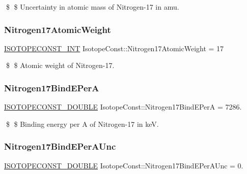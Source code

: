 \$ \$ Uncertainty in atomic mass of Nitrogen-\/17 in amu. \mbox{\label{group___isotope_const-_nitrogen-_n17_gacd721ae378ba38ecdf43a0a69a57ee52}} 
\subsubsection{\texorpdfstring{Nitrogen17\+Atomic\+Weight}{Nitrogen17AtomicWeight}}
{\footnotesize\ttfamily \mbox{\hyperlink{group___isotope_const-_macros_ga5f18360b3e99483a35c32d789e62621c}{I\+S\+O\+T\+O\+P\+E\+C\+O\+N\+S\+T\+\_\+\+I\+NT}} Isotope\+Const\+::\+Nitrogen17\+Atomic\+Weight = 17}

\$ \$ Atomic weight of Nitrogen-\/17. \mbox{\label{group___isotope_const-_nitrogen-_n17_gac155f17c87be01d90f3550236cef4a2b}} 
\subsubsection{\texorpdfstring{Nitrogen17\+Bind\+E\+PerA}{Nitrogen17BindEPerA}}
{\footnotesize\ttfamily \mbox{\hyperlink{group___isotope_const-_macros_ga8f45a7272ce02c0b4c65c44636ed719a}{I\+S\+O\+T\+O\+P\+E\+C\+O\+N\+S\+T\+\_\+\+D\+O\+U\+B\+LE}} Isotope\+Const\+::\+Nitrogen17\+Bind\+E\+PerA = 7286.}

\$ \$ Binding energy per A of Nitrogen-\/17 in keV. \mbox{\label{group___isotope_const-_nitrogen-_n17_ga35a46fc0d5192ae96f87175b6d0a8b40}} 
\subsubsection{\texorpdfstring{Nitrogen17\+Bind\+E\+Per\+A\+Unc}{Nitrogen17BindEPerAUnc}}
{\footnotesize\ttfamily \mbox{\hyperlink{group___isotope_const-_macros_ga8f45a7272ce02c0b4c65c44636ed719a}{I\+S\+O\+T\+O\+P\+E\+C\+O\+N\+S\+T\+\_\+\+D\+O\+U\+B\+LE}} Isotope\+Const\+::\+Nitrogen17\+Bind\+E\+Per\+A\+Unc = 0.}

